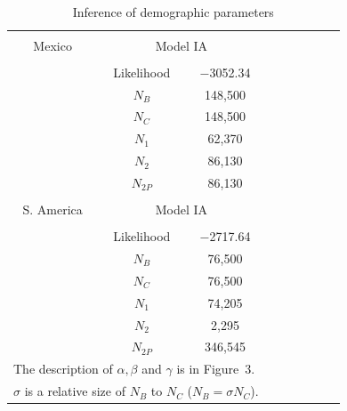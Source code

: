 \renewcommand{\arraystretch}{1.1}
\begin{table}[h]

\begin{center}
 \caption[]{Inference of demographic parameters\hspace*{0.3cm}}
  \textbf{}\\[-2mm]
{\fontsize{8}{11}\sf
    \begin{tabular}{ccccccccl} \hline\hline
       & & \\[-3mm]
     Mexico  & \multicolumn{2}{c}{Model IA}  \\[0.1cm]
    \hline
    & & \\[-3mm]
   & Likelihood & $-$3052.34  \\
  &$N_B$ & 148,500 \\
  &$N_C$ & 148,500 \\   
  &$N_1$ & 62,370 \\ 
  &$N_2$ & 86,130 \\ 
  &$N_{2P}$   & 86,130    \\ 
      \hline
    & & \\[-3mm]
    S. America  & \multicolumn{2}{c}{Model IA}  \\[0.1cm]
        \hline
    & & \\[-3mm]
     & Likelihood &  $-$2717.64  \\
       &$N_B$ & 76,500 \\     	
       &$N_C$ & 76,500 \\
      &$N_1$ & 74,205           \\ 
      &$N_2$ & 2,295       \\      
      &$N_{2P}$   & 346,545   \\[1mm]
    \hline\hline
\multicolumn{3}{l}{The description of $\alpha, \beta$ and $\gamma$ is in Figure~3.}\\
\multicolumn{3}{l}{$\sigma$ is a relative size of $N_B$ to $N_C$ ($N_B=\sigma N_C$).}\\
    \end{tabular}
    \label{supp:param}  %
}
\end{center}
\end{table}
\renewcommand{\arraystretch}{1}


